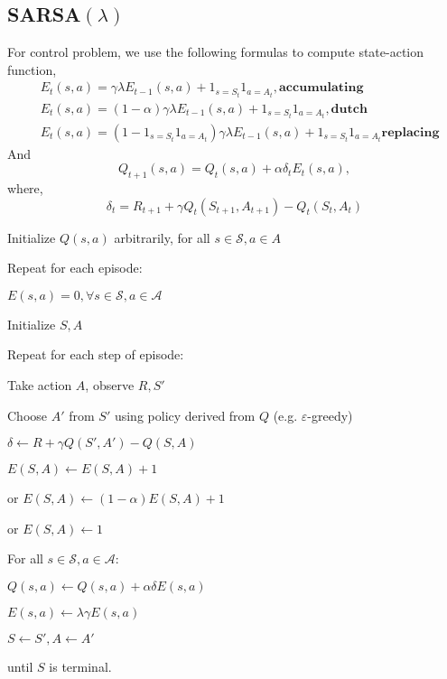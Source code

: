 \documentclass[11pt,a4paper]{article}
\def\S{{\mathcal S}}
\def\A{{\mathcal A}}
\begin{document}
\subsection{SARSA$(\lambda)$}
For control problem, we use the following formulas to compute state-action function,
\begin{eqnarray}
& E_t(s,a) = \gamma\lambda E_{t-1}(s,a) + 1_{s=S_t}1_{a=A_t}, \textbf{accumulating} \\ 
& E_t(s,a) = (1-\alpha)\gamma\lambda E_{t-1}(s,a) + 1_{s=S_t}1_{a=A_t}, \textbf{dutch} \\ 
& E_t(s,a) = (1- 1_{s=S_t}1_{a=A_t})\gamma\lambda E_{t-1}(s,a) + 1_{s=S_t}1_{a=A_t} \textbf{replacing} 
\end{eqnarray}
And
\begin{equation}
Q_{t+1}(s,a) = Q_t(s,a) + \alpha \delta_t E_t(s,a),
\end{equation}
where,
\begin{equation}
\delta_t = R_{t+1} + \gamma Q_t(S_{t+1},A_{t+1}) -Q_t(S_t,A_t)
\end{equation}

\begin{tcolorbox}
Initialize $Q(s,a)$ arbitrarily, for all $s\in\S, a\in A$\par 
Repeat for each episode:\par 
\hspace{1cm} $E(s,a) = 0,\forall s\in\S, a\in\A$ \par 
\hspace{1cm} Initialize $S,A$ \par 
\hspace{1cm} Repeat for each step of episode: \par 
\hspace{2cm} Take action $A$, observe $R,S'$ \par 
\hspace{2cm} Choose $A'$ from $S'$ using policy derived from $Q$ (e.g. $\varepsilon$-greedy) \par 
\hspace{2cm} $\delta \leftarrow R + \gamma Q(S',A') - Q(S,A)$ \par 
\hspace{2cm} $E(S,A) \leftarrow E(S,A) + 1$ \par 
\hspace{2cm} or $E(S,A) \leftarrow (1-\alpha)E(S,A) + 1$ \par 
\hspace{2cm} or $E(S,A) \leftarrow 1$ \par 
\hspace{2cm} For all $s\in \S, a\in \A$: \par 
\hspace{3cm} $Q(s,a) \leftarrow Q(s,a) + \alpha \delta E(s,a)$ \par 
\hspace{3cm} $E(s,a) \leftarrow \lambda\gamma E(s,a)$ \par 
\hspace{2cm} $S \leftarrow S', A \leftarrow A'$ \par 
\hspace{1cm} until $S$ is terminal.
\end{tcolorbox}
\end{document}
